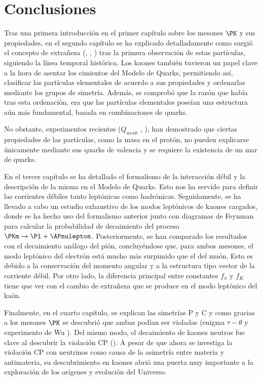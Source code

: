 \chapter{Conclusiones}\label{cap:conclusions}

Tras una primera introducción en el primer capítulo sobre los mesones $\PK$ y sus propiedades, en el segundo capítulo se ha explicado detalladamente como surgió el concepto de extrañeza (\cite{Nature1}, \cite{Nishijima1955}, \cite{Pais}) tras la primera observación de estas partículas, siguiendo la línea temporal histórica. Los kaones también tuvieron un papel clave a la hora de asentar los cimientos del Modelo de Quarks, permitiendo así, clasificar las partículas elementales de acuerdo a sus propiedades y ordenarlas mediante los grupos de simetría. Además, se comprobó que la razón que había tras esta ordenación, era que las partículas elementales poseían una estructura aún más fundamental, basada en combinaciones de quarks.

No obstante, experimentos recientes ($Q_{weak}$ \cite{nuruzzaman}, \cite{carlini}), han demostrado que ciertas propiedades de las partículas, como la masa en el protón, no pueden explicarse únicamente mediante sus quarks de valencia y se requiere la existencia de un mar de quarks.

En el tercer capítulo se ha detallado el formalismo de la interacción débil y la descripción de la misma en el Modelo de Quarks. Esto nos ha servido para definir las corrientes débiles tanto leptónicas como hadrónicas. Seguidamente, se ha llevado a cabo un estudio exhaustivo de los modos leptónicos de kaones cargados, donde se ha hecho uso del formalismo anterior junto con diagramas de Feynman para calcular la probabilidad de decaimiento del proceso $\PKm \rightarrow \Pl + \APnulepton$. Posteriormente, se han comparado los resultados con el decaimiento análogo del pión, concluyéndose que, para ambos mesones, el modo leptónico del electrón está mucho más surpimido que el del muón. Esto es debido a la conservación del momento angular y a la estructura tipo vector de la corriente débil. Por otro lado, la diferencia principal entre constantes $f_{\pi}$ y $f_{K}$ tiene que ver con el cambio de extrañeza que se produce en el modo leptónico del kaón.

Finalmente, en el cuarto capítulo, se explican las simetrías P y C y como gracias a los mesones $\PK$ se descubrió que ambas podían ser violadas (enigma $\tau-\theta$ y experimento de Wu \cite{Wu1957}). Del mismo modo, el decaimiento de kaones neutros fue clave al descubrir la violación CP (\cite{Cronin}). A pesar de que ahora se investiga la violación CP con neutrinos como causa de la asimetría entre materia y antimateria, su descubrimiento en kaones abrió una puerta muy importante a la exploración de los orígenes y evolución del Universo.